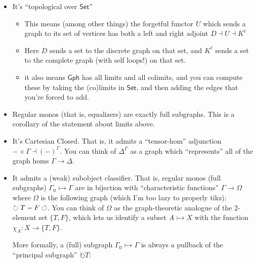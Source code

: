 \documentclass[12pt]{article}
\theoremstyle{definition}
\newcommand{\monor}{\rightarrowtail}
\begin{document}
\begin{itemize}
  \item It's ``topological over $\mathsf{Set}$''
    \begin{itemize}
      \item This means (among other things) the forgetful functor $U$ which 
        sends a graph to its set of vertices has both a left and right adjoint
        $D \dashv U \dashv K^\ell$
      \item Here $D$ sends a set to the discrete graph on that set, and $K^\ell$
        sends a set to the complete graph (with self loops!) on that set.
      \item it also means $\mathsf{Gph}$ has all limits and all colimits,
        and you can compute these by taking the (co)limits in $\mathsf{Set}$,
        and then adding the edges that you're forced to add.
    \end{itemize}
  \item Regular monos (that is, equalizers) are exactly full subgraphs. 
    This is a corollary of the statement about limits above.
  \item It's Cartesian Closed. That is, it admits a ``tensor-hom'' 
    adjunction $- \times \Gamma \dashv (-)^\Gamma$. You can think of $\Delta^\Gamma$
    as a graph which ``represents'' all of the graph homs $\Gamma \to \Delta$.
  \item It admits a (weak) subobject classifier. That is, regular monos (full subgraphs)
    $\Gamma_0 \monor \Gamma$ are in bijection with ``characteristic functions''
    $\Gamma \to \Omega$ where $\Omega$ is the following graph (which I'm too lazy to properly tikz): 
    $\circlearrowright T \-- F \circlearrowleft$. You can think of $\Omega$ as the 
    graph-theoretic analogue of the 2-element set $\{T,F\}$, which lets us
    identify a subset $A \monor X$ with the function $\chi_A : X \to \{T,F\}$.

    More formally, a (full) subgraph $\Gamma_0 \monor \Gamma$ is always a 
    pullback of the ``principal subgraph'' $\circlearrowright T$:

    \begin{center}
    \end{center}
\end{itemize}
\end{document}
